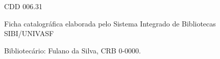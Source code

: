 \begin{fichacatalografica}
\begin{center}
{\begin{minipage}[t][7.5cm][t]{12.5cm}
\begin{minipage}[t][7.5cm][t]{11.5cm}
			\vspace{-0.5cm}
			\center
			\hspace{-1.0cm} CDD 006.31
			\end{minipage}
		\end{minipage}
	}
	\end{center}
	\vspace{-1.0cm}
	\center
	\scriptsize Ficha catalográfica elaborada pelo Sistema Integrado de Bibliotecas SIBI/UNIVASF

	\vspace{-0.5cm}
	\center \scriptsize Bibliotecário: Fulano da Silva, CRB 0-0000.
	
\end{fichacatalografica}
